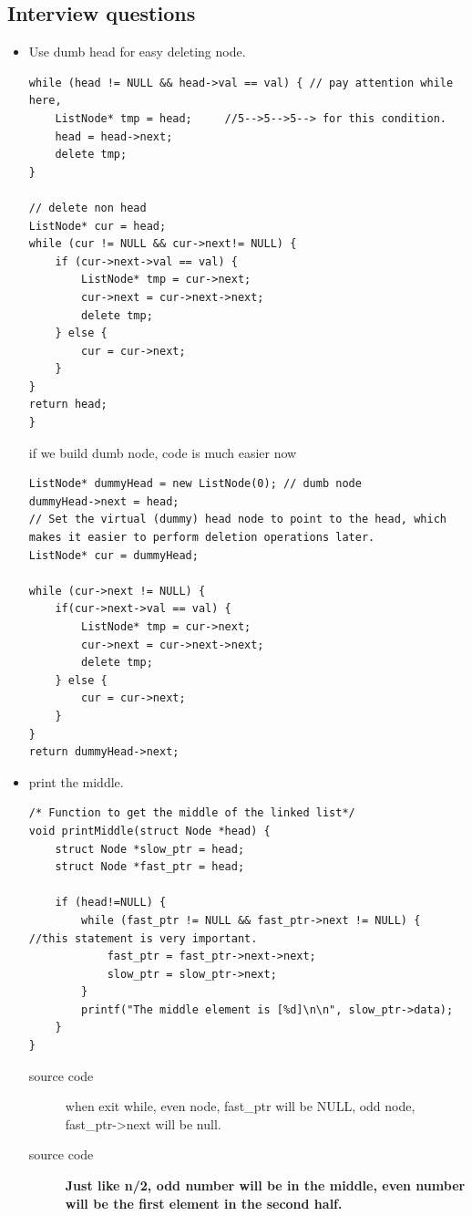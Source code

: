 \documentclass[a4paper,11pt,twoside]{book}
\begin{document}
\subsection{Interview questions}
\begin{itemize}
	\item Use dumb head for easy deleting node. 
\begin{lstlisting}
while (head != NULL && head->val == val) { // pay attention while here, 
	ListNode* tmp = head;     //5-->5-->5--> for this condition.
	head = head->next;
	delete tmp;
}

// delete non head 
ListNode* cur = head;
while (cur != NULL && cur->next!= NULL) {
	if (cur->next->val == val) {
		ListNode* tmp = cur->next;
		cur->next = cur->next->next;
		delete tmp;
	} else {
		cur = cur->next;
	}
}
return head;
}
\end{lstlisting}

if we build dumb node, code is much easier now
\begin{lstlisting}
ListNode* dummyHead = new ListNode(0); // dumb node
dummyHead->next = head; 
// Set the virtual (dummy) head node to point to the head, which makes it easier to perform deletion operations later.
ListNode* cur = dummyHead;

while (cur->next != NULL) {
	if(cur->next->val == val) {
		ListNode* tmp = cur->next;
		cur->next = cur->next->next;
		delete tmp;
	} else {
		cur = cur->next;
	}
}
return dummyHead->next;
\end{lstlisting}
	
	\item print the middle. 
\begin{lstlisting}[breaklines]
/* Function to get the middle of the linked list*/
void printMiddle(struct Node *head) { 
	struct Node *slow_ptr = head; 
	struct Node *fast_ptr = head; 

	if (head!=NULL) {		 
		while (fast_ptr != NULL && fast_ptr->next != NULL) {  //this statement is very important.
			fast_ptr = fast_ptr->next->next; 
			slow_ptr = slow_ptr->next; 
		} 
		printf("The middle element is [%d]\n\n", slow_ptr->data); 
	} 
} 
\end{lstlisting}
\begin{description}
	\item[source code] when exit while, even node, fast\_ptr will be NULL, odd node, fast\_ptr->next will be null.
	\item[source code] \textbf{Just like n/2, odd number will be in the middle, even number will be the first element in the second half.}
\end{description}
	

\end{itemize}
\end{document}
